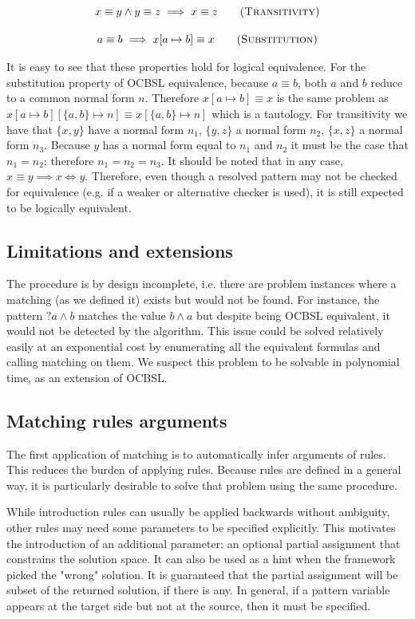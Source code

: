 \begin{gather}
  {x \equiv y \land y \equiv z} \implies {x \equiv z} \tag{\textsc{Transitivity}} \\[1em]
  {a \equiv b} \implies {x[a \mapsto b] \equiv x} \tag{\textsc{Substitution}}
\end{gather}

It is easy to see that these properties hold for logical equivalence. For the substitution property of OCBSL equivalence, because $a \equiv b$, both $a$ and $b$ reduce to a common normal form $n$. Therefore $x[a \mapsto b] \equiv x$ is the same problem as $x[a \mapsto b][\{a, b\} \mapsto n] \equiv x[\{a, b\} \mapsto n]$ which is a tautology. For transitivity we have that $\{x, y\}$ have a normal form $n_1$, $\{y, z\}$ a normal form $n_2$, $\{x, z\}$ a normal form $n_3$. Because $y$ has a normal form equal to $n_1$ and $n_2$ it must be the case that $n_1 = n_2$; therefore $n_1 = n_2 = n_3$.
It should be noted that in any case, $x \equiv y \implies x \Leftrightarrow y$. Therefore, even though a resolved pattern may not be checked for equivalence (e.g. if a weaker or alternative checker is used), it is still expected to be logically equivalent.

\subsection{Limitations and extensions}

The procedure is by design incomplete, i.e. there are problem instances where a matching (as we defined it) exists but would not be found. For instance, the pattern ${?a} \land b$ matches the value $b \land a$ but despite being OCBSL equivalent, it would not be detected by the algorithm. This issue could be solved relatively easily at an exponential cost by enumerating all the equivalent formulas and calling matching on them. We suspect this problem to be solvable in polynomial time, as an extension of OCBSL.

\subsection{Matching rules arguments}

The first application of matching is to automatically infer arguments of rules. This reduces the burden of applying rules. Because rules are defined in a general way, it is particularly desirable to solve that problem using the same procedure.

While introduction rules can usually be applied backwards without ambiguity, other rules may need some parameters to be specified explicitly. This motivates the introduction of an additional parameter: an optional partial assignment that constrains the solution space. It can also be used as a hint when the framework picked the "wrong" solution. It is guaranteed that the partial assignment will be subset of the returned solution, if there is any. In general, if a pattern variable appears at the target side but not at the source, then it must be specified.
